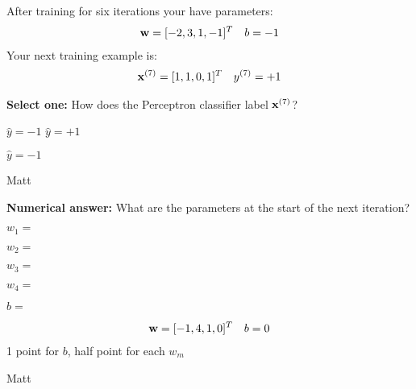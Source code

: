\begin{parts}
After training for six iterations your have parameters:
\begin{align*}
    \mathbf{w} = [-2, 3, 1, -1]^T && b = -1
\end{align*}
Your next training example is:
\begin{align*}
    \mathbf{x}^{(7)} = [1, 1, 0, 1]^T && y^{(7)} = +1
\end{align*}

\begin{subparts}

\subpart[2] \textbf{Select one:} How does the Perceptron classifier label $\mathbf{x}^{(7)}$?
    \begin{checkboxes}
     \choice $\hat{y} = -1$
     \choice $\hat{y} = +1$
    \end{checkboxes}
    \begin{soln}
    $\hat{y} = -1$
    \end{soln}
    \begin{qauthor}
    Matt
    \end{qauthor}

\subpart[3] \textbf{Numerical answer:} What are the parameters at the start of the next iteration?

     $w_1 = $ \begin{tcolorbox}[fit,height=1cm, width=2cm, blank, borderline={1pt}{-2pt}, nobeforeafter=false]
    \end{tcolorbox}
    
     $w_2 = $ \begin{tcolorbox}[fit,height=1cm, width=2cm, blank, borderline={1pt}{-2pt}, nobeforeafter=false]
    \end{tcolorbox}
    
     $w_3 = $ \begin{tcolorbox}[fit,height=1cm, width=2cm, blank, borderline={1pt}{-2pt}, nobeforeafter=false]
    \end{tcolorbox}
    
     $w_4 = $ \begin{tcolorbox}[fit,height=1cm, width=2cm, blank, borderline={1pt}{-2pt}, nobeforeafter=false]
    \end{tcolorbox}
    
     $b = $ \begin{tcolorbox}[fit,height=1cm, width=2cm, blank, borderline={1pt}{-2pt}, nobeforeafter=false]
    \end{tcolorbox}
    \begin{soln}
    \begin{align*}
        \mathbf{w} = [-1, 4, 1, 0]^T && b = 0
    \end{align*}
    1 point for $b$, half point for each $w_m$
    \end{soln}
    \begin{qauthor}
    Matt
    \end{qauthor}
    
\end{subparts}

\end{parts}